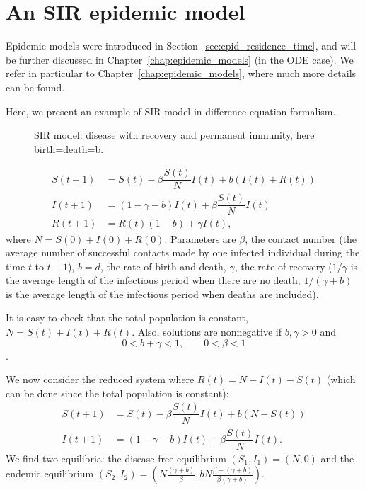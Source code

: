 \section{An SIR epidemic model}
Epidemic models were introduced in Section~\ref{sec:epid_residence_time}, and will be further discussed in Chapter~\ref{chap:epidemic_models} (in the ODE case). We refer in particular to Chapter~\ref{chap:epidemic_models}, where much more details can be found.

Here, we present an example of SIR model in difference equation formalism.
\begin{figure}[h]
\caption{SIR model: disease with recovery and permanent immunity, here birth=death=b.}
\end{figure}
\begin{align}
S(t+1) &= S(t)-\beta \dfrac{S(t)}{N}I(t) +b(I(t)+R(t))\\
I(t+1) &= (1-\gamma -b)I(t)+\beta \dfrac{S(t)}{N}I(t)\\
R(t+1) &= R(t)(1-b)+\gamma I(t),
\end{align}
where $N=S(0)+I(0)+R(0)$. Parameters are $\beta$, the contact number (the average number of successful contacts made by one infected individual during the time $t$ to $t+1$), $b=d$, the rate of birth and death, $\gamma$, the rate of recovery ($1/\gamma $ is the average length of the infectious period when there are no death, $1/(\gamma +b)$ is the average length of the infectious period when deaths are included).

It is easy to check that the total population is constant, $N=S(t)+I(t)+R(t)$.
Also, solutions are nonnegative if $b,\gamma>0$ and
$$0<b+\gamma <1, \qquad 0<\beta <1$$.

We now consider the reduced system where $R(t)=N-I(t)-S(t)$ (which can be done since the total population is constant):
\begin{align*}
S(t+1)&=S(t)-\beta \dfrac{S(t)}{N}I(t) +b(N-S(t))\\
I(t+1)&=(1-\gamma -b)I(t)+\beta \dfrac{S(t)}{N}I(t).
\end{align*}
We find two equilibria: the disease-free equilibrium $(S_1,I_1)=(N,0)$ and the endemic equilibrium $(S_2,I_2)=\left (N\frac{(\gamma+b)}{\beta},bN\frac{\beta - (\gamma + b)}{\beta (\gamma +b)}\right)$.


